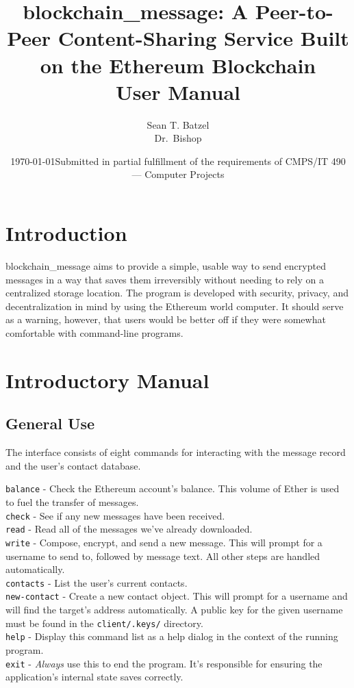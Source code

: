 \documentclass[titlepage]{report}
\title{blockchain\_message: A Peer-to-Peer Content-Sharing Service Built on the Ethereum Blockchain\\\large User Manual}
\author{Sean T. Batzel\\Dr.\ Bishop}
\date{\today\endgraf\bigskip Submitted in partial fulfillment of the requirements of CMPS/IT 490 --- Computer Projects}
\begin{document}
\maketitle

\tableofcontents

\nocite{*}

\pagebreak

\section{Introduction}
blockchain\_message aims to provide a simple, usable way to send encrypted messages in a way that saves them irreversibly without needing to rely on a centralized storage location. The program is developed with security, privacy, and decentralization in mind by using the \gls{Ethereum} world computer. It should serve as a warning, however, that users would be better off if they were somewhat comfortable with \gls{command-line} programs.

\section{Introductory Manual}
\subsection{General Use}
The interface consists of eight commands for interacting with the message record and the user's contact database.\\

{\raggedright{}
\texttt{balance} - Check the Ethereum account's balance. This volume of Ether is used to fuel the transfer of messages.\\
\texttt{check} - See if any new messages have been received.\\
\texttt{read} - Read all of the messages we've already downloaded.\\
\texttt{write} - Compose, encrypt, and send a new message. This will prompt for a username to send to, followed by message text. All other steps are handled automatically.\\
\texttt{contacts} - List the user's current contacts.\\
\texttt{new-contact} - Create a new contact object. This will prompt for a username and will find the target's address automatically. A public key for the given username must be found in the \texttt{client/.keys/} directory.\\
\texttt{help} - Display this command list as a help dialog in the context of the running program.\\
\texttt{exit} - \textit{Always} use this to end the program. It's responsible for ensuring the application's internal state saves correctly.\\
}
\end{document}
